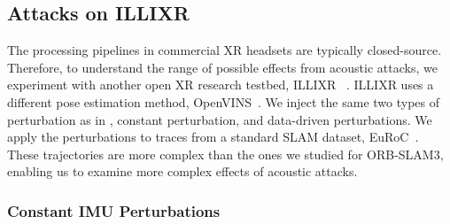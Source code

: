 \subsection{Attacks on ILLIXR}
\label{subsec:exp-illixr}

The processing pipelines in commercial XR headsets are typically closed-source.
Therefore, to understand the range of possible effects from acoustic attacks, we experiment with another open XR research testbed, ILLIXR ~\cite{huzaifa2022illixr}.
ILLIXR uses a different pose estimation method, OpenVINS~\cite{geneva2020openvins}.
We inject the same two types of perturbation as in , constant perturbation, and data-driven perturbations.
We apply the perturbations to traces from a standard SLAM dataset, EuRoC~\cite{Burri25012016}. 
These trajectories are more complex than the ones we studied for ORB-SLAM3, enabling us to examine more complex effects of acoustic attacks.

\subsubsection{Constant IMU Perturbations} 

